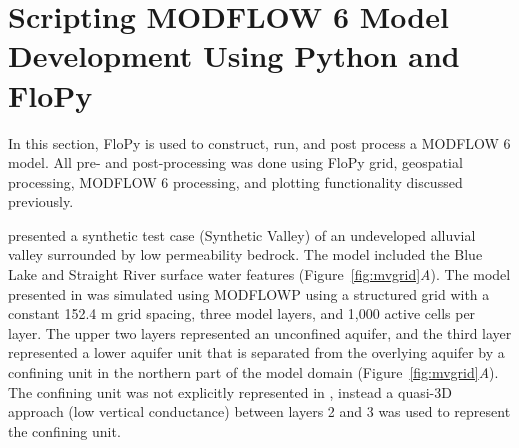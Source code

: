 \documentclass[11pt, oneside]{article}  	%
\begin{document}
\section{Scripting MODFLOW 6 Model Development Using Python and FloPy}

In this section, FloPy is used to construct, run, and post process a MODFLOW 6 model.  All pre- and post-processing was done using FloPy grid, geospatial processing, MODFLOW 6 processing, and plotting functionality discussed previously.

\cite{hill1998} presented a synthetic test case (Synthetic Valley) of an undeveloped alluvial valley surrounded by low permeability bedrock. The model included the Blue Lake and Straight River surface water features (Figure~\ref{fig:mvgrid}\textit{A}). The model presented in \cite{hill1998} was simulated using MODFLOWP \citep{hill1992computer} using a structured grid with a constant 152.4 m grid spacing, three model layers, and 1,000 active cells per layer. The upper two layers represented an unconfined aquifer, and the third layer represented a lower aquifer unit that is separated from the overlying aquifer by a confining unit in the northern part of the model domain (Figure~\ref{fig:mvgrid}\textit{A}). The confining unit was not explicitly represented in \cite{hill1998}, instead a quasi-3D approach (low vertical conductance) between layers 2 and 3 was used to represent the confining unit.

\end{document}
